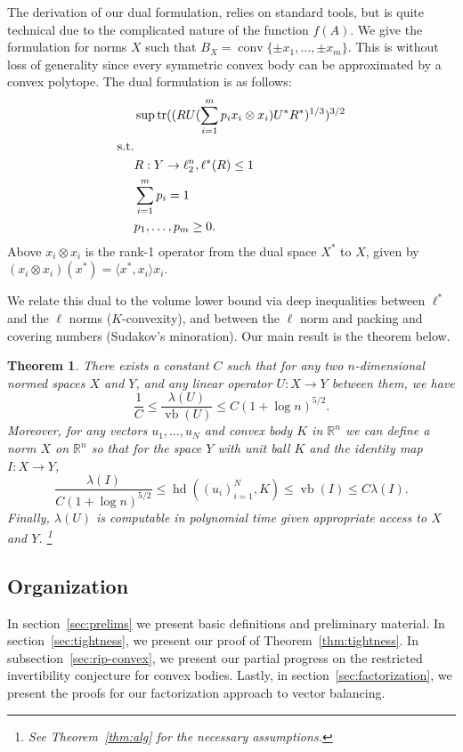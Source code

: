 \documentclass[11pt]{article}
\newtheorem{theorem}{Theorem}
\newcommand{\R}{{\mathbb{R}}}
\DeclareMathOperator{\hd}{hd}
\DeclareMathOperator{\vb}{vb}
\DeclareMathOperator{\conv}{conv}
\DeclareMathOperator{\tr}{tr}
\begin{document}
The derivation of our dual formulation, relies on
standard tools, but is quite technical due to the complicated nature
of the function $f(A)$. We give the formulation for norms $X$ such
that $B_X = \conv\{\pm x_1, \ldots, \pm x_m\}$. This is without loss
of generality since every symmetric convex body can be approximated by
a convex polytope. The dual formulation is as follows:
\begin{align*}
  &\sup \tr((RU(\sum_{i = 1}^m{p_i x_i \otimes  x_i})U^*R^*)^{1/3})^{3/2}\\
  \text{s.t.}\notag\\
  &R: Y \to \ell_2^n, \ell^*(R) \le 1 \\
  &\sum_{i = 1}^m{p_i} = 1\\
  &p_1, \ldots, p_m \ge 0. 
\end{align*}
Above $x_i \otimes x_i$ is the rank-1 operator from the dual space
$X^*$ to $X$, given by $(x_i \otimes x_i)(x^*) = \langle x^*,
x_i\rangle x_i$. 

We relate this dual to the volume lower bound via deep inequalities
between $\ell^*$ and the $\ell$ norms ($K$-convexity), and between the
$\ell$ norm and packing and covering numbers (Sudakov's
minoration). Our main result is the theorem below.

\begin{theorem}\label{thm:fact-main}
  There exists a constant $C$ such that for any two $n$-dimensional
  normed spaces $X$ and $Y$, and any linear operator $U:X \to Y$
  between them, we have
  \[
  \frac1C \le \frac{\lambda(U)}{\vb(U)} \le C (1 + \log n)^{5/2}.
  \]
  Moreover, for any vectors $u_1, \ldots, u_N$ and convex body $K$ in
  $\R^n$ we can define a norm $X$ on $\R^n$ so that for the space $Y$
  with unit ball $K$ and the identity map $I:X \to Y$,
  \[
  \frac{\lambda(I)}{C(1 + \log n)^{5/2}} 
  \le \hd((u_i)_{i = 1}^N, K) \le \vb(I) 
  \le C \lambda(I).
  \]
  Finally, $\lambda(U)$ is computable in polynomial time given
  appropriate access to $X$ and $Y$.
  \footnote{See Theorem~\ref{thm:alg} for the necessary assumptions.}
\end{theorem}

\subsection{Organization}

In section~\ref{sec:prelims} we present basic definitions and preliminary
material. In section~\ref{sec:tightness}, we present our proof of
Theorem~\ref{thm:tightness}. In subsection~\ref{sec:rip-convex}, we present our
partial progress on the restricted invertibility conjecture for convex bodies.
Lastly, in section~\ref{sec:factorization}, we present the proofs for our
factorization approach to vector balancing.
\end{document}

